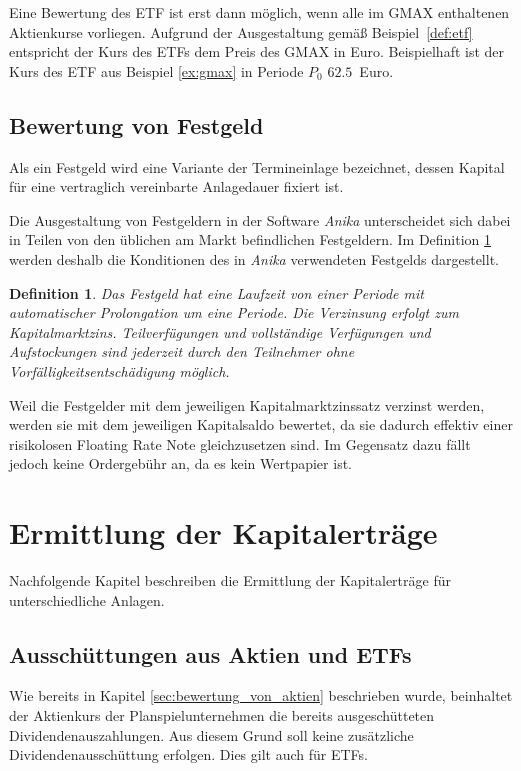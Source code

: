 \documentclass[12pt, a4paper]{article}
\theoremstyle{plain}
\newtheorem{definition}{Definition}
\begin{document}
Eine Bewertung des \gls{ETF} ist erst dann möglich, wenn alle im \gls{GMAX} enthaltenen Aktienkurse vorliegen. Aufgrund der Ausgestaltung gemäß Beispiel~\ref{def:etf} entspricht der Kurs des \glspl{ETF} dem Preis des \gls{GMAX} in Euro. 
Beispielhaft ist der Kurs des \gls{ETF} aus Beispiel \ref{ex:gmax} in Periode $P_0$ $62.5$~Euro.

\subsection{Bewertung von Festgeld}
\label{sec:bewertung_von_festgeldern}

Als ein Festgeld wird eine Variante der Termineinlage bezeichnet, dessen Kapital für eine vertraglich vereinbarte Anlagedauer fixiert ist.

Die Ausgestaltung von Festgeldern in der Software \textit{Anika} unterscheidet sich dabei in Teilen von den üblichen am Markt befindlichen Festgeldern. Im Definition \ref{def:festgeld} werden deshalb die Konditionen des in \textit{Anika} verwendeten Festgelds dargestellt.

\begin{definition}
	\label{def:festgeld}
	Das Festgeld hat eine Laufzeit von einer Periode mit automatischer Prolongation um eine Periode. Die Verzinsung erfolgt zum Kapitalmarktzins. Teilverfügungen und vollständige Verfügungen und Aufstockungen sind jederzeit durch den Teilnehmer ohne Vorfälligkeitsentschädigung möglich. 
\end{definition}

Weil die Festgelder mit dem jeweiligen Kapitalmarktzinssatz verzinst werden, werden sie mit dem jeweiligen Kapitalsaldo bewertet, da sie dadurch effektiv einer risikolosen Floating Rate Note gleichzusetzen sind. Im Gegensatz dazu fällt jedoch keine Ordergebühr an, da es kein Wertpapier ist.

\section{Ermittlung der Kapitalerträge}
\label{sec:ermittlung_von_wertpapierertraegen}

Nachfolgende Kapitel beschreiben die Ermittlung der Kapitalerträge für unterschiedliche Anlagen.

\subsection{Ausschüttungen aus Aktien und ETFs}
\label{sec:ausschuettung_aus_aktie}
Wie bereits in Kapitel \ref{sec:bewertung_von_aktien} beschrieben wurde, beinhaltet der Aktienkurs der Planspielunternehmen die bereits ausgeschütteten Dividendenauszahlungen. Aus diesem Grund soll keine zusätzliche Dividendenausschüttung erfolgen. Dies gilt auch für \glspl{ETF}.
\end{document}
